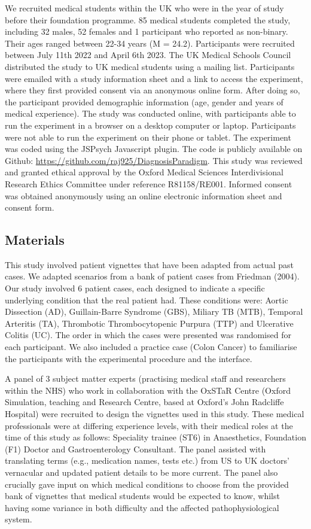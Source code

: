 \documentclass[a4paper, nobind]{templates/ociamthesis}
\begin{document}
We recruited medical students within the UK who were in the year of study before their foundation programme. 85 medical students completed the study, including 32 males, 52 females and 1 participant who reported as non-binary. Their ages ranged between 22-34 years (M = 24.2). Participants were recruited between July 11th 2022 and April 6th 2023. The UK Medical Schools Council distributed the study to UK medical students using a mailing list. Participants were emailed with a study information sheet and a link to access the experiment, where they first provided consent via an anonymous online form. After doing so, the participant provided demographic information (age, gender and years of medical experience). The study was conducted online, with participants able to run the experiment in a browser on a desktop computer or laptop. Participants were not able to run the experiment on their phone or tablet. The experiment was coded using the JSPsych Javascript plugin. The code is publicly available on Github: \url{https://github.com/raj925/DiagnosisParadigm}. This study was reviewed and granted ethical approval by the Oxford Medical Sciences Interdivisional Research Ethics Committee under reference R81158/RE001. Informed consent was obtained anonymously using an online electronic information sheet and consent form.

\hypertarget{materials}{%
\subsection*{Materials}\label{materials}}

This study involved patient vignettes that have been adapted from actual past cases. We adapted scenarios from a bank of patient cases from Friedman (2004). Our study involved 6 patient cases, each designed to indicate a specific underlying condition that the real patient had. These conditions were: Aortic Dissection (AD), Guillain-Barre Syndrome (GBS), Miliary TB (MTB), Temporal Arteritis (TA), Thrombotic Thrombocytopenic Purpura (TTP) and Ulcerative Colitis (UC). The order in which the cases were presented was randomised for each participant. We also included a practice case (Colon Cancer) to familiarise the participants with the experimental procedure and the interface.

A panel of 3 subject matter experts (practising medical staff and researchers within the NHS) who work in collaboration with the OxSTaR Centre (Oxford Simulation, teaching and Research Centre, based at Oxford's John Radcliffe Hospital) were recruited to design the vignettes used in this study. These medical professionals were at differing experience levels, with their medical roles at the time of this study as follows: Speciality trainee (ST6) in Anaesthetics, Foundation (F1) Doctor and Gastroenterology Consultant. The panel assisted with translating terms (e.g., medication names, tests etc.) from US to UK doctors' vernacular and updated patient details to be more current. The panel also crucially gave input on which medical conditions to choose from the provided bank of vignettes that medical students would be expected to know, whilst having some variance in both difficulty and the affected pathophysiological system.
\end{document}
